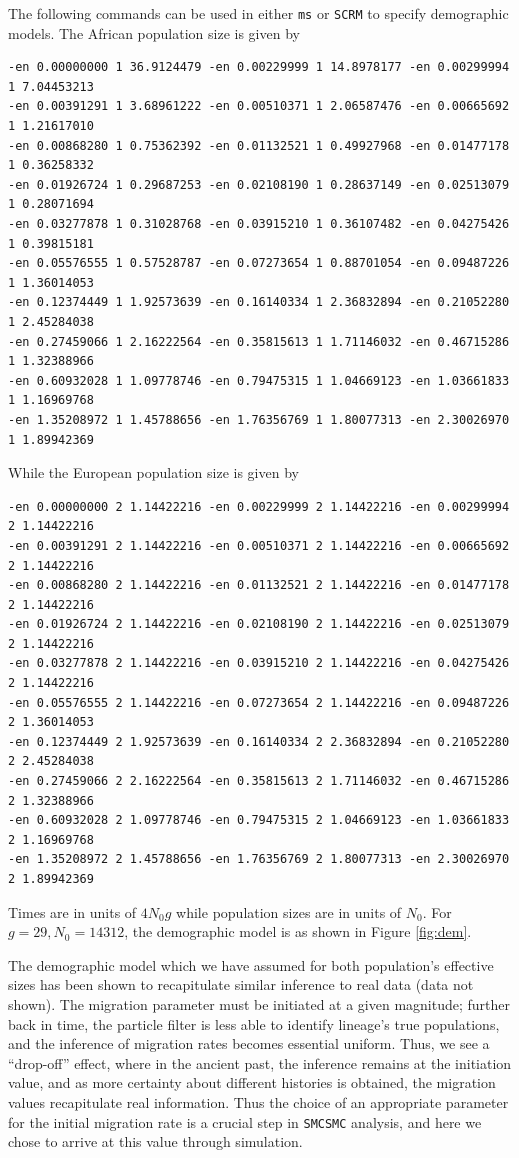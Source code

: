 \documentclass{article}
\begin{document}
The following commands can be used in either {\tt ms} or {\tt SCRM} to specify demographic models. The African population size is given by 

\begin{verbatim}
-en 0.00000000 1 36.9124479 -en 0.00229999 1 14.8978177 -en 0.00299994 1 7.04453213 
-en 0.00391291 1 3.68961222 -en 0.00510371 1 2.06587476 -en 0.00665692 1 1.21617010
-en 0.00868280 1 0.75362392 -en 0.01132521 1 0.49927968 -en 0.01477178 1 0.36258332
-en 0.01926724 1 0.29687253 -en 0.02108190 1 0.28637149 -en 0.02513079 1 0.28071694
-en 0.03277878 1 0.31028768 -en 0.03915210 1 0.36107482 -en 0.04275426 1 0.39815181
-en 0.05576555 1 0.57528787 -en 0.07273654 1 0.88701054 -en 0.09487226 1 1.36014053
-en 0.12374449 1 1.92573639 -en 0.16140334 1 2.36832894 -en 0.21052280 1 2.45284038
-en 0.27459066 1 2.16222564 -en 0.35815613 1 1.71146032 -en 0.46715286 1 1.32388966
-en 0.60932028 1 1.09778746 -en 0.79475315 1 1.04669123 -en 1.03661833 1 1.16969768
-en 1.35208972 1 1.45788656 -en 1.76356769 1 1.80077313 -en 2.30026970 1 1.89942369
\end{verbatim}

While the European population size is given by

\begin{verbatim}
-en 0.00000000 2 1.14422216 -en 0.00229999 2 1.14422216 -en 0.00299994 2 1.14422216
-en 0.00391291 2 1.14422216 -en 0.00510371 2 1.14422216 -en 0.00665692 2 1.14422216
-en 0.00868280 2 1.14422216 -en 0.01132521 2 1.14422216 -en 0.01477178 2 1.14422216
-en 0.01926724 2 1.14422216 -en 0.02108190 2 1.14422216 -en 0.02513079 2 1.14422216
-en 0.03277878 2 1.14422216 -en 0.03915210 2 1.14422216 -en 0.04275426 2 1.14422216
-en 0.05576555 2 1.14422216 -en 0.07273654 2 1.14422216 -en 0.09487226 2 1.36014053
-en 0.12374449 2 1.92573639 -en 0.16140334 2 2.36832894 -en 0.21052280 2 2.45284038 
-en 0.27459066 2 2.16222564 -en 0.35815613 2 1.71146032 -en 0.46715286 2 1.32388966
-en 0.60932028 2 1.09778746 -en 0.79475315 2 1.04669123 -en 1.03661833 2 1.16969768
-en 1.35208972 2 1.45788656 -en 1.76356769 2 1.80077313 -en 2.30026970 2 1.89942369
\end{verbatim}

Times are in units of $4N_0g$ while population sizes are in units of $N_0$. For $g=29, N_0 = 14312$, the demographic model is as shown in Figure \ref{fig:dem}.  

The demographic model which we have assumed for both population's effective sizes has been shown to recapitulate similar inference to real data (data not shown). The migration parameter must be initiated at a given magnitude; further back in time, the particle filter is less able to identify lineage's true populations, and the inference of migration rates becomes essential uniform. Thus, we see a ``drop-off'' effect, where in the ancient past, the inference remains at the initiation value, and as more certainty about different histories is obtained, the migration values recapitulate real information. Thus the choice of an appropriate parameter for the initial migration rate is a crucial step in {\tt SMCSMC} analysis, and here we chose to arrive at this value through simulation.
\end{document}
